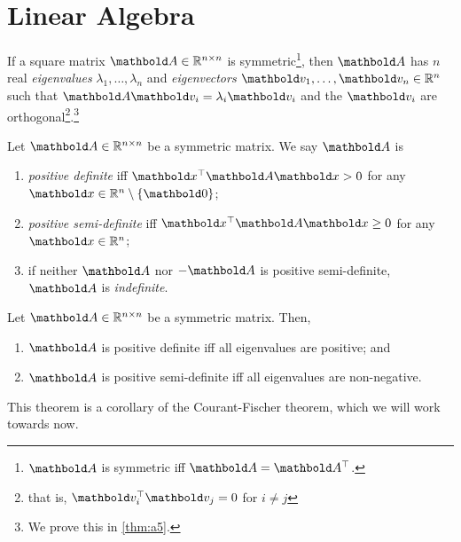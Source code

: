 
\chapter{Linear Algebra}

If a square matrix $\mA \in \R^{n \times n}$ is symmetric\footnote{$\mA$ is symmetric iff $\mA = \trans{\mA}$.}, then $\mA$ has $n$ real \emph{eigenvalues} $\lambda_1, \dots, \lambda_n$ and \emph{eigenvectors} $\vv_1, \dots, \vv_n \in \R^n$ such that $\mA\vv_i = \lambda_i\vv_i$ and the $\vv_i$ are orthogonal\footnote{that is, $\trans{\vv_i}\vv_j = 0$ for $i \neq j$}.\footnote{We prove this in \cref{thm:a5}.}

\begin{defn}
Let $\mA \in \R^{n \times n}$ be a symmetric matrix. We say $\mA$ is \begin{enumerate}
    \item \emph{positive definite} iff $\trans{\vx}\mA\vx > 0$ for any $\vx \in \R^n \setminus \{\vZero\}$;
    \item \emph{positive semi-definite} iff $\trans{\vx}\mA\vx \geq 0$ for any $\vx \in \R^n$;
    \item if neither $\mA$ nor $-\mA$ is positive semi-definite, $\mA$ is \emph{indefinite}.
\end{enumerate}
\end{defn}
\begin{thm}\label{thm:psd_eigenvalues}
Let $\mA \in \R^{n \times n}$ be a symmetric matrix. Then, \begin{enumerate}
    \item $\mA$ is positive definite iff all eigenvalues are positive; and
    \item $\mA$ is positive semi-definite iff all eigenvalues are non-negative.
\end{enumerate}
\end{thm}\noindent This theorem is a corollary of the Courant-Fischer theorem, which we will work towards now.

